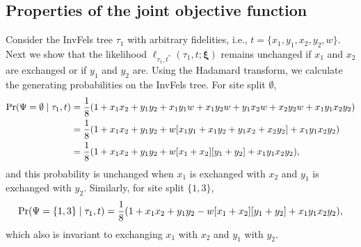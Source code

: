 \subsection*{Properties of the joint objective function}

Consider the InvFels tree $\tau_1$ with arbitrary fidelities, i.e., $t=\{x_1,y_1,x_2,y_2,w\}$.
Next we show that the likelihood $\ell_{\tau_1,t^*}(\tau_1, t; \boldsymbol\xi)$ remains unchanged if $x_1$ and $x_2$ are exchanged or if $y_1$ and $y_2$ are.
Using the Hadamard transform, we calculate the generating probabilities on the InvFels tree.
For site split $\emptyset$,
\begin{align*}
    \Pr(\Psi=\emptyset\mid \tau_1, t) & = \frac{1}{8} (1 + x_1x_2 +  y_1y_2 +  x_1y_1w + x_1y_2w + y_1x_2w + x_2y_2w + x_1y_1x_2y_2) \\
                                              & = \frac{1}{8} (1 + x_1x_2 +  y_1y_2 +  w[x_1y_1 + x_1y_2 + y_1x_2 + x_2y_2] + x_1y_1x_2y_2) \\
                                              & = \frac{1}{8} (1 + x_1x_2 +  y_1y_2 +  w[x_1 + x_2][y_1 + y_2] + x_1y_1x_2y_2),
\end{align*}
and this probability is unchanged when $x_1$ is exchanged with $x_2$ and $y_1$ is exchanged with $y_2$.
Similarly, for site split $\{1,3\}$,
\[
    \Pr(\Psi=\{1,3\}\mid \tau_1, t) = \frac{1}{8} (1 + x_1x_2 +  y_1y_2 -  w[x_1 + x_2][y_1 + y_2] + x_1y_1x_2y_2),
\]
which also is invariant to exchanging $x_1$ with $x_2$ and $y_1$ with $y_2$.

